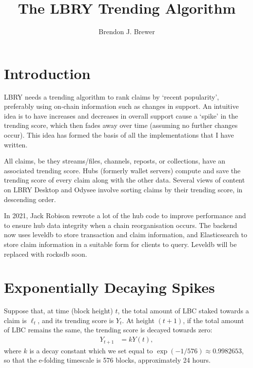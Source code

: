 \documentclass[a4paper, 12pt]{article}
\title{The LBRY Trending Algorithm}
\author{Brendon J. Brewer}
\date{}
\begin{document}
\maketitle


\setlength{\parindent}{0pt}
\setlength{\parskip}{8pt}

\section{Introduction}
LBRY needs a trending algorithm to rank claims by `recent popularity',
preferably using on-chain information such as changes in support. An
intuitive idea is to have increases and decreases in overall support cause
a `spike' in the trending score, which then fades away over time
(assuming no further changes occur). This idea has formed the basis of all the
implementations that I have written.

All claims, be they streams/files, channels, reposts, or collections, have
an associated trending score. Hubs (formerly wallet servers) compute and
save the trending score of every claim along with the other data. Several
views of content on LBRY Desktop and Odysee involve sorting claims by their
trending score, in descending order.

In 2021, Jack Robison rewrote a lot of the hub code to improve performance
and to ensure hub data integrity when a chain reorganisation occurs. The
backend now uses leveldb to store transaction and claim information, and
Elasticsearch to store claim information in a suitable form for clients to
query. Leveldb will be replaced with rocksdb soon.

\section{Exponentially Decaying Spikes}
Suppose that, at time (block height) $t$, the total amount of LBC staked
towards a claim is $\ell_t$, and its trending score is $Y_t$. At height
$(t+1)$, if the total amount of LBC remains the same, the trending score
is decayed towards zero:
\begin{align}
Y_{t+1} &= kY(t), \label{eqn:decay}
\end{align}
where $k$ is a decay constant which we set equal to
$\exp(-1/576) \approx 0.9982653$, so that the e-folding timescale is 576
blocks, approximately 24 hours.
\end{document}
